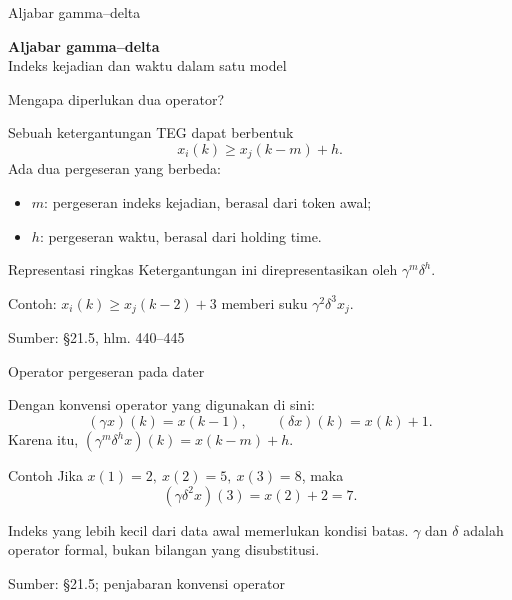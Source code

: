 \documentclass[aspectratio=169,11pt]{beamer}
\newcommand{\source}[1]{%
    \vfill
    \hfill{\tiny\color{gray}Sumber: #1}
}
\begin{document}
\begin{frame}{Aljabar gamma--delta}
\begin{center}{\LARGE\bfseries\color{AcademicBlue}Aljabar gamma--delta}\\[8mm]Indeks kejadian dan waktu dalam satu model\end{center}
\end{frame}
\begin{frame}{Mengapa diperlukan dua operator?}


Sebuah ketergantungan TEG dapat berbentuk
\[
x_i(k)\ge x_j(k-m)+h.
\]
Ada dua pergeseran yang berbeda:
\begin{itemize}
\item $m$: pergeseran indeks kejadian, berasal dari token awal;
\item $h$: pergeseran waktu, berasal dari holding time.
\end{itemize}
\begin{block}{Representasi ringkas}
Ketergantungan ini direpresentasikan oleh $\gamma^m\delta^h$.
\end{block}
Contoh: $x_i(k)\ge x_j(k-2)+3$ memberi suku $\gamma^2\delta^3x_j$.

\source{\S21.5, hlm. 440--445}

\end{frame}
\begin{frame}{Operator pergeseran pada dater}


Dengan konvensi operator yang digunakan di sini:
\[
(\gamma x)(k)=x(k-1),\qquad
(\delta x)(k)=x(k)+1.
\]
Karena itu, $(\gamma^m\delta^h x)(k)=x(k-m)+h$.
\begin{exampleblock}{Contoh}
Jika $x(1)=2,\ x(2)=5,\ x(3)=8$, maka
\[
(\gamma\delta^2x)(3)=x(2)+2=7.
\]
\end{exampleblock}
Indeks yang lebih kecil dari data awal memerlukan kondisi batas.
$\gamma$ dan $\delta$ adalah operator formal, bukan bilangan yang disubstitusi.

\source{\S21.5; penjabaran konvensi operator}

\end{frame}
\end{document}
